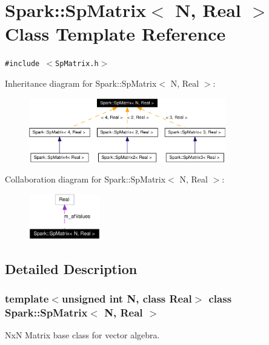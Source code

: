 \section{Spark::Sp\-Matrix$<$ N, Real $>$ Class Template Reference}
\label{classSpark_1_1SpMatrix}
{\tt \#include $<$Sp\-Matrix.h$>$}

Inheritance diagram for Spark::Sp\-Matrix$<$ N, Real $>$:\begin{figure}[H]
\begin{center}
\leavevmode
\includegraphics[width=243pt]{classSpark_1_1SpMatrix__inherit__graph}
\end{center}
\end{figure}
Collaboration diagram for Spark::Sp\-Matrix$<$ N, Real $>$:\begin{figure}[H]
\begin{center}
\leavevmode
\includegraphics[width=88pt]{classSpark_1_1SpMatrix__coll__graph}
\end{center}
\end{figure}


\subsection{Detailed Description}
\subsubsection*{template$<$unsigned int N, class Real$>$ class Spark::Sp\-Matrix$<$ N, Real $>$}

Nx\-N Matrix base class for vector algebra. 

